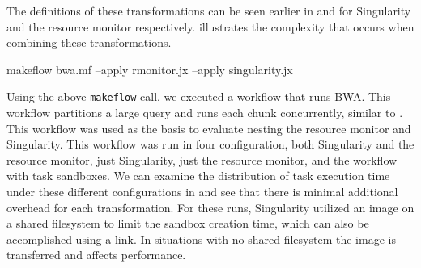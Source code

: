 \documentclass[conference]{IEEEtran}
\begin{document}
The definitions of these transformations can
be seen earlier in  and 
for Singularity and the resource monitor respectively.
 illustrates 
the complexity that occurs when combining these
transformations.


\begin{framed}
\noindent
{\small makeflow bwa.mf --apply rmonitor.jx --apply singularity.jx}
\end{framed}

Using the above {\tt makeflow} call, we executed a workflow 
that runs BWA\cite{pmid20080505}.
This workflow partitions a large query and runs 
each chunk concurrently,
similar to . 
This workflow was used as the basis to evaluate 
nesting the resource monitor and Singularity.
This workflow was run in four configuration,
both Singularity and the resource monitor,
just Singularity,
just the resource monitor,
and the workflow with task sandboxes.
We can examine the distribution of task
execution time under these different 
configurations in 
and see that there is minimal additional
overhead for each transformation.
For these runs, Singularity utilized
an image on a shared filesystem to
limit the sandbox creation time,
which can also be accomplished using
a link. In situations with no shared
filesystem the image is transferred
and affects performance.
\end{document}
